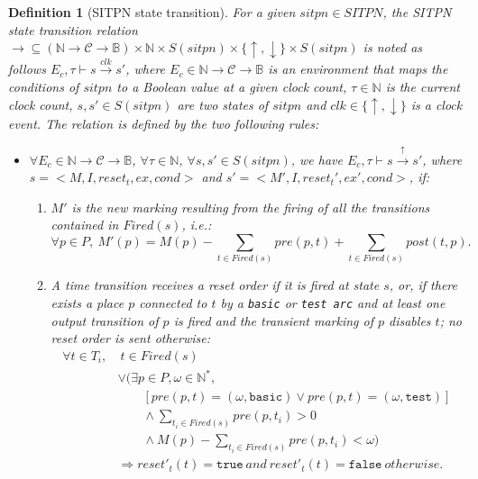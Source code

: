 \documentclass[pdflatex,sn-mathphys]{sn-jnl}%
\theoremstyle{thmstyleone}%
\theoremstyle{thmstyletwo}%
\theoremstyle{thmstylethree}%
\newtheorem{definition}{Definition}%
\begin{document}
\begin{definition}[SITPN state transition]
  \label{def:semantics}
  For a given $sitpn\in{}SITPN$, the SITPN state transition relation
  $\rightarrow\subseteq{}(\mathbb{N}\rightarrow\mathcal{C}\rightarrow\mathbb{B})\times{}\mathbb{N}\times{}S(sitpn)\times{}\{\uparrow,\downarrow\}\times{}S(sitpn)$
  is noted as follows $E_c,\tau\vdash{}s\xrightarrow{clk}s'$, where
  $E_c\in\mathbb{N}\rightarrow\mathcal{C}\rightarrow\mathbb{B}$ is an
  environment that maps the conditions of $sitpn$ to a Boolean value
  at a given clock count, $\tau\in\mathbb{N}$ is the current clock
  count, $s,s'\in{}S(sitpn)$ are two states of $sitpn$ and
  $clk\in\{\uparrow,\downarrow\}$ is a clock event. The relation is
  defined by the two following rules:
  
  \begin{itemize}
  \item
    $\forall{}E_c\in\mathbb{N}\rightarrow\mathcal{C}\rightarrow\mathbb{B}$,
    $\forall\tau\in\mathbb{N}$, $\forall{}s,s'\in{}S(sitpn)$, we have
    $E_c,\tau\vdash{}s\xrightarrow{\uparrow}s'$, where
    $s=<M,I,reset_t,ex,cond>$ and $s'=<M',I,reset_t',ex',cond>$, if:
    \begin{enumerate}
    \item\label{it:new-marking} $M'$ is the new marking resulting
      from
      the firing of all the transitions contained in $Fired(s)$, i.e.:
      \begin{equation*}
        \forall{}p\in{}P,~M'(p)=M(p)-\sum\limits_{t\in{}Fired(s)}pre(p,t)+\sum\limits_{t\in{}Fired(s)}post(t,p).
      \end{equation*}
      
    \item\label{it:reset-order} A time transition receives a reset
      order if it is fired at state $s$, or, if there exists a place
      $p$ connected to $t$ by a \texttt{basic} or \texttt{test arc}
      and at least one output transition of $p$ is fired and the
      transient marking of $p$ disables $t$; no reset order is sent
      otherwise:
      \begin{equation*}
        \begin{split}
          \forall{}t\in{}T_i,&~t\in{}Fired(s) \\
                             &\lor\big(\exists{}p\in{}P,\omega\in\mathbb{N}^{*}, \\
                             &\quad\quad{}[pre(p,t)=(\omega,\mathtt{basic})\lor{}pre(p,t)=(\omega,\mathtt{test})] \\
                             &\quad\quad\land\sum\limits_{t_i\in{}Fired(s)}pre(p,t_i)>0 \\
                             &\quad\quad\land{}M(p)-\sum\limits_{t_i\in{}Fired(s)}pre(p,t_i)<\omega\big)\\
                             & \Rightarrow{}reset'_t(t)=\mathtt{true}~and~reset'_t(t)=\mathtt{false}~otherwise.  \\
        \end{split}
      \end{equation*}
      

\end{enumerate}
\end{itemize}
\end{definition}
\end{document}
